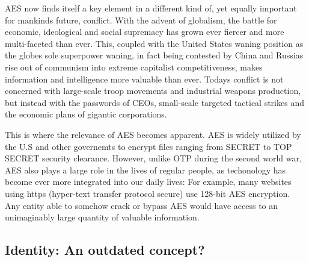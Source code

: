 \documentclass[12pt]{report}
\theoremstyle{definition}
\theoremstyle{remark}
\begin{document}
AES now finds itself a key element in a different kind of, yet equally important for mankinds future, conflict. With the advent of globalism, the battle for economic, ideological and social supremacy has grown ever fiercer and more multi-faceted than ever. This, coupled with the United States waning position as the globes sole superpower waning, in fact being contested by China and Russias rise out of communism into extreme capitalist competitiveness, makes information and intelligence more valuable than ever. Todays conflict is not concerned with large-scale troop movements and industrial weapons production, but instead with the passwords of CEOs, small-scale targeted tactical strikes and the economic plans of gigantic corporations.

This is where the relevance of AES becomes apparent. AES is widely utilized by the U.S and other governemts to encrypt files ranging from SECRET to TOP SECRET security clearance. However, unlike OTP during the second world war, AES also plays a large role in the lives of regular people, as techonology has become ever more integrated into our daily lives: For example, many websites using https (hyper-text transfer protocol secure) use 128-bit AES encryption. Any entity able to somehow crack or bypass AES would have access to an unimaginably large quantity of valuable information.

\subsection{Identity: An outdated concept?}



\printbibliography
\end{document}
